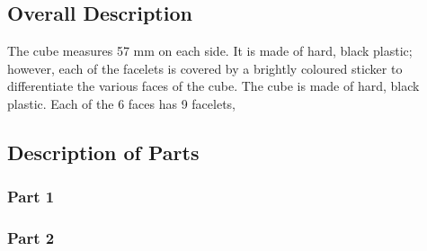 \subsection{Overall Description}
The cube measures 57 mm on each side. It is made of hard, black plastic; however, each of the facelets is covered by a brightly coloured sticker to differentiate the various faces of the cube. 
The cube is made of hard, black plastic. Each of the 6 faces has 9 facelets, 
\subsection{Description of Parts}
	\subsubsection{Part 1}
	\subsubsection{Part 2}	